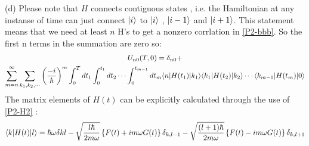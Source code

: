 \begin{homeworkProblem}
\begin{homeworkSection}{(d)}
Please note that $H$ connects contiguous states , i.e. the Hamiltonian at any instanse of time can just connect  $|i\rangle$ to $|i\rangle$ , $|i-1\rangle$ and $|i+1\rangle$. This statement means that we need at least $n$ H's to get a nonzero corrlation in \eqref{P2-bbb}. So the first n terms in the summation are zero so:
 \begin{multline}\label{P2-bbb}
U_{n0}(T,0)=\delta_{n0}+\\
\sum\limits_{m=n}^{\infty}\sum\limits_{k_1,k_2,\cdots}\left(\frac{-i}{\hbar}\right)^m\int_0^{T}dt_1\int_0^{t_1}dt_2\cdots\int_0^{t_{m-1}}dt_m\langle n|H(t_1)|k_1\rangle\langle k_1|H(t_2)|k_2\rangle\cdots \langle k_{m-1}|H(t_m)|0\rangle
\end{multline}
The matrix elements of $H(t)$ can be explicitly calculated through the use of \eqref{P2-H2} :
\begin{equation}
\langle k|H(t)|l\rangle=\hbar\omega\delta{kl}-\sqrt{\frac{l\hbar}{2m\omega}}\left\{F(t)+im\omega G(t)\right\}\delta_{k,l-1}-\sqrt{\frac{(l+1)\hbar}{2m\omega}}\left\{F(t)-im\omega G(t)\right\}\delta_{k,l+1}
\end{equation}
\end{homeworkSection}
\end{homeworkProblem}